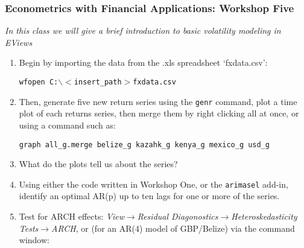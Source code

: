 \documentclass[a4paper,11pt]{article}
\begin{document}
\small
\subsubsection*{Econometrics with Financial Applications: Workshop Five}
\textit{In this class we will give a brief introduction to basic volatility modeling in EViews}
\begin{enumerate}
\item Begin by importing the data from the .xls spreadsheet `fxdata.csv':
\begin{center}
\texttt{wfopen C:$\backslash<$insert\_path$>$fxdata.csv}
\end{center}
\item Then, generate five new return series using the \texttt{genr} command, plot a time plot of each returns series, then merge them by right clicking all at once, or using a command such as:
\begin{center}
\texttt{graph all\_g.merge belize\_g kazahk\_g kenya\_g mexico\_g usd\_g}
\end{center}
\item What do the plots tell us about the series?
\item Using either the code written in Workshop One, or the \texttt{arimasel} add-in, identify an optimal AR(p) up to ten lags for one or more of the series.
\item Test for ARCH effects: \emph{View}$\rightarrow$\emph{Residual Diagonostics}$\rightarrow$\emph{Heteroskedasticity Tests}$\rightarrow$\emph{ARCH}, or (for an AR(4) model of GBP/Belize) via the command window:


\end{enumerate}
\end{document}
